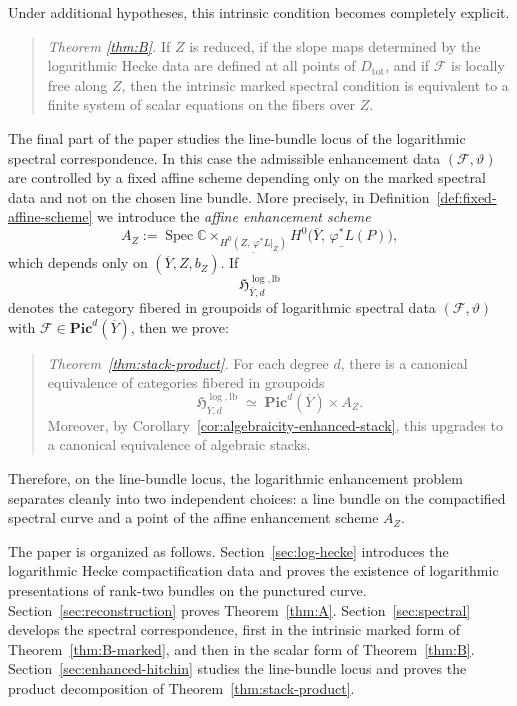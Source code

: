 \documentclass[a4paper,12pt]{amsart}
\numberwithin{equation}{section}
\theoremstyle{definition}
\newcommand{\Spec}{\operatorname{Spec}}
\newcommand{\CC}{\mathbb C}
\begin{document}
Under additional hypotheses, this intrinsic condition becomes completely explicit.

\begin{quote}
\emph{Theorem \ref{thm:B}.}
If \(Z\) is reduced, if the slope maps determined by the logarithmic Hecke data are defined at all points of \(D_{\mathrm{tot}}\), and if \(\mathcal F\) is locally free along \(Z\), then the intrinsic marked spectral condition is equivalent to a finite system of scalar equations on the fibers over \(Z\).
\end{quote}

The final part of the paper studies the line-bundle locus of the logarithmic spectral correspondence. In this case the admissible enhancement data \((\mathcal F,\vartheta)\) are controlled by a fixed affine scheme depending only on the marked spectral data and not on the chosen line bundle. More precisely, in Definition~\ref{def:fixed-affine-scheme} we introduce the \emph{affine enhancement scheme}
\[
A_Z
:=
\Spec \CC
\times_{\underline{H^0(Z,\,\varphi^*L|_Z)}}
\underline{H^0\bigl(\overline{Y},\,\varphi^*L(P)\bigr)},
\]
which depends only on \((\overline{Y},Z,b_Z)\). If
\[
\mathfrak H^{\log,\mathrm{lb}}_{\overline{Y},d}
\]
denotes the category fibered in groupoids of logarithmic spectral data \((\mathcal F,\vartheta)\) with \(\mathcal F\in \mathbf{Pic}^d(\overline{Y})\), then we prove:

\begin{quote}
\emph{Theorem~\ref{thm:stack-product}.}
For each degree \(d\), there is a canonical equivalence of categories fibered in groupoids
\[
\mathfrak H^{\log,\mathrm{lb}}_{\overline{Y},d}
\;\simeq\;
\mathbf{Pic}^d(\overline{Y})\times A_Z.
\]
Moreover, by Corollary~\ref{cor:algebraicity-enhanced-stack}, this upgrades to a canonical equivalence of algebraic stacks.
\end{quote}

Therefore, on the line-bundle locus, the logarithmic enhancement problem separates cleanly into two independent choices: a line bundle on the compactified spectral curve and a point of the affine enhancement scheme \(A_Z\).

The paper is organized as follows. Section~\ref{sec:log-hecke} introduces the logarithmic Hecke compactification data and proves the existence of logarithmic presentations of rank-two bundles on the punctured curve. Section~\ref{sec:reconstruction} proves Theorem~\ref{thm:A}. Section~\ref{sec:spectral} develops the spectral correspondence, first in the intrinsic marked form of Theorem~\ref{thm:B-marked}, and then in the scalar form of Theorem~\ref{thm:B}. Section~\ref{sec:enhanced-hitchin} studies the line-bundle locus and proves the product decomposition of Theorem~\ref{thm:stack-product}.
\end{document}
